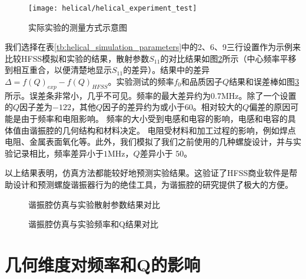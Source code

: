 \begin{figure}
    \centering
    \caption[实际实验的测量方式示意图]{实际实验的测量方式示意图\label{fig:helical_experiment_test}}
    \texttt{[image: helical/helical\_experiment\_test]}
\end{figure}

我们选择在表\ref{tb:helical_simulation_parameters}中的2、6、9三行设置作为示例来比较HFSS模拟和实验的结果，散射参数$S_{11}$的对比结果如图\ref{fig:helical_compares}所示（中心频率平移到相互重合，以便清楚地显示$S_{11}$的差异）。结果中的差异$\Delta=f(Q)_{exp}-f(Q)_{HFSS}$。实验测试的频率$f_0$和品质因子$Q$结果和误差棒如图\ref{fig:helical_compares_f_q}所示。误差条非常小，几乎不可见。频率的最大差异约为$0.7$MHz。除了一个设置的$Q$因子差为$-122$，其他$Q$因子的差异约为或小于$60$。相对较大的$Q$偏差的原因可能是由于频率和电阻影响。
频率的大小受到电感和电容的影响，电感和电容的具体值由谐振腔的几何结构和材料决定。
电阻受材料和加工过程的影响，例如焊点电阻、金属表面氧化等。此外，我们模拟了我们之前使用的几种螺旋设计，并与实验记录相比，频率差异小于$1$MHz，$Q$差异小于 $50$。

以上结果表明，仿真方法都能较好地预测实验结果。这验证了HFSS商业软件是帮助设计和预测螺旋谐振器行为的绝佳工具，为谐振腔的研究提供了极大的方便。

\begin{figure}
    \centering
    \caption[谐振腔仿真与实验散射参数结果对比]{谐振腔仿真与实验散射参数结果对比\label{fig:helical_compares}}
\end{figure}


\begin{figure}
    \centering
    \caption[谐振腔仿真与实验频率和Q结果对比]{谐振腔仿真与实验频率和Q结果对比\label{fig:helical_compares_f_q}}
\end{figure}

\section[几何参数对频率和Q的影响]{几何维度对频率和Q的影响}

